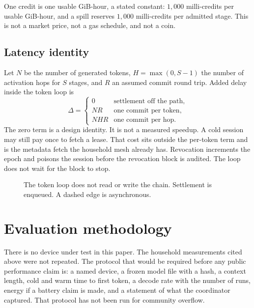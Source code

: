 \documentclass[11pt]{article}
\begin{document}
One credit is one usable GiB-hour, a stated constant: \(1{,}000\) milli-credits per usable GiB-hour, and a spill reserves \(1{,}000\) milli-credits per admitted stage. This is not a market price, not a gas schedule, and not a coin.

\subsection{Latency identity}
Let \(N\) be the number of generated tokens, \(H=\max(0,S-1)\) the number of activation hops for \(S\) stages, and \(R\) an assumed commit round trip. Added delay inside the token loop is
\begin{equation}
\Delta=
\begin{cases}
0 & \text{settlement off the path},\\
N R & \text{one commit per token},\\
N H R & \text{one commit per hop}.
\end{cases}
\end{equation}
The zero term is a design identity. It is not a measured speedup. A cold session may still pay once to fetch a lease. That cost sits outside the per-token term and is the metadata fetch the household mesh already has. Revocation increments the epoch and poisons the session before the revocation block is audited. The loop does not wait for the block to stop.

\begin{figure}[t]
\centering
{}
\caption{The token loop does not read or write the chain. Settlement is enqueued. A dashed edge is asynchronous.}
\label{fig:rails}
\end{figure}

\section{Evaluation methodology}
There is no device under test in this paper. The household measurements cited above were not repeated. The protocol that would be required before any public performance claim is: a named device, a frozen model file with a hash, a context length, cold and warm time to first token, a decode rate with the number of runs, energy if a battery claim is made, and a statement of what the coordinator captured. That protocol has not been run for community overflow.
\end{document}
